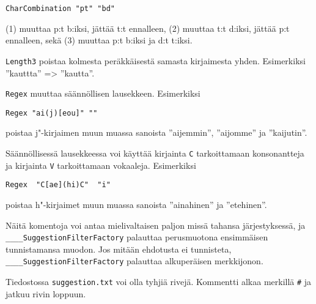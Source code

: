 \documentclass[12pt,a4paper]{scrartcl}
\begin{document}
\verb|CharCombination "pt" "bd"|

(1) muuttaa p:t b:iksi, jättää t:t ennalleen,
(2) muuttaa t:t d:iksi, jättää p:t ennalleen, sekä
(3) muuttaa p:t b:iksi ja d:t t:iksi.


\bigskip
\verb|Length3| poistaa kolmesta peräkkäisestä samasta kirjaimesta
yhden. Esimerkiksi ''kauttta'' => ''kautta''.


\bigskip
\verb|Regex| muuttaa säännöllisen lausekkeen. Esimerkiksi

\verb|Regex "ai(j)[eou]" ""|

poistaa j"-kirjaimen muun muassa sanoista ''aijemmin'', ''aijomme'' ja
''kaijutin''.


Säännöllisessä lausekkeessa voi käyttää kirjainta \verb|C|
tarkoittamaan konsonantteja ja kirjainta \verb|V| tarkoittamaan
vokaaleja. Esimerkiksi

\verb|Regex  "C[ae](hi)C"  "i"|

poistaa h"-kirjaimet muun muassa sanoista ''ainahinen'' ja
''etehinen''.

\bigskip
Näitä komentoja voi antaa mielivaltaisen paljon missä tahansa
järjestyksessä, ja \\ \verb|____SuggestionFilterFactory| palauttaa
perusmuotona ensimmäisen tunnistamansa muodon. Jos mitään ehdotusta ei
tunnisteta, \verb|____SuggestionFilterFactory| palauttaa alkuperäisen
merkkijonon.

Tiedostossa \verb|suggestion.txt| voi olla tyhjiä rivejä. Kommentti
alkaa merkillä \verb|#| ja jatkuu rivin loppuun.
\end{document}
